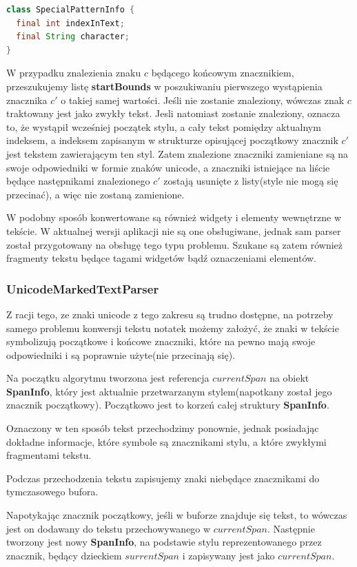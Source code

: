 \begin{lstlisting}[language=Java]
class SpecialPatternInfo {
  final int indexInText;
  final String character;
}
\end{lstlisting}

W przypadku znalezienia znaku $c$ będącego końcowym znacznikiem, przeszukujemy listę \textbf{startBounds} w poszukiwaniu pierwszego wystąpienia znacznika $c'$ o takiej samej wartości. Jeśli nie zostanie znaleziony, wówczas znak $c$ traktowany jest jako zwykły tekst. Jesli natomiast zostanie znaleziony, oznacza to, że wystąpił wcześniej początek stylu, a cały tekst pomiędzy aktualnym indeksem, a indeksem zapisanym w strukturze opisującej początkowy znacznik $c'$ jest tekstem zawierającym ten styl. Zatem znalezione znaczniki zamieniane są na swoje odpowiedniki w formie znaków unicode, a znaczniki istniejące na liście będące następnikami znalezionego $c'$ zostają usunięte z listy(style nie mogą się przecinać), a więc nie zostaną zamienione.

W podobny sposób konwertowane są również widgety i elementy wewnętrzne w tekście. W aktualnej wersji aplikacji nie są one obsługiwane, jednak sam parser został przygotowany na obsługę tego typu problemu. Szukane są zatem również fragmenty tekstu będące tagami widgetów bądź oznaczeniami elementów.

\subsubsection{UnicodeMarkedTextParser}

Z racji tego, ze znaki unicode z tego zakresu są trudno dostępne, na potrzeby samego problemu konwersji tekstu notatek możemy założyć, że znaki w tekście symbolizują początkowe i końcowe znaczniki, które na pewno mają swoje odpowiedniki i są poprawnie użyte(nie przecinają się).

Na początku algorytmu tworzona jest referencja $currentSpan$ na obiekt \textbf{SpanInfo}, który jest aktualnie przetwarzanym stylem(napotkany został jego znacznik początkowy). Początkowo jest to korzeń całej struktury \textbf{SpanInfo}.

Oznaczony w ten sposób tekst przechodzimy ponownie, jednak posiadając dokładne informacje, które symbole są znacznikami stylu, a które zwykłymi fragmentami tekstu.

Podczas przechodzenia tekstu zapisujemy znaki niebędące znacznikami do tymczasowego bufora.

Napotykając znacznik początkowy, jeśli w buforze znajduje się tekst, to wówczas jest on dodawany do tekstu przechowywanego w $currentSpan$. Następnie tworzony jest nowy \textbf{SpanInfo}, na podstawie stylu reprezentowanego przez znacznik, będący dzieckiem $surrentSpan$ i zapisywany jest jako $currentSpan$. 

